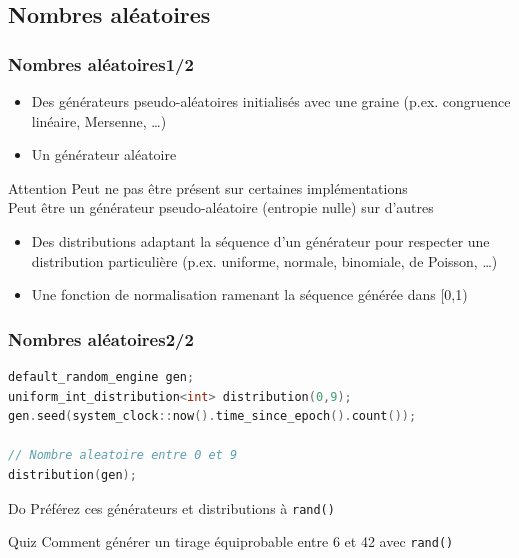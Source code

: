\documentclass[C++.tex]{subfiles}
\begin{document}
\subsection*{Nombres aléatoires}
\begin{frame}[fragile]
	\frametitle{Nombres aléatoires\titlehfill{}1/2}
	\begin{itemize}
		\item Des générateurs pseudo-aléatoires initialisés avec une graine (p.ex. congruence linéaire, Mersenne, \ldots)
		\item Un générateur aléatoire
	\end{itemize}

	\begin{alertblock}{Attention}
		Peut ne pas être présent sur certaines implémentations\\
		Peut être un générateur pseudo-aléatoire (entropie nulle) sur d'autres
	\end{alertblock}

	\begin{itemize}
		\item Des distributions adaptant la séquence d'un générateur pour respecter une distribution particulière (p.ex. uniforme, normale, binomiale, de Poisson, \ldots)
		\item Une fonction de normalisation ramenant la séquence générée dans [0,1)
	\end{itemize}
\end{frame}

\begin{frame}[fragile]
	\frametitle{Nombres aléatoires\titlehfill{}2/2}
	\begin{lstlisting}[language=C++]
default_random_engine gen;
uniform_int_distribution<int> distribution(0,9);
gen.seed(system_clock::now().time_since_epoch().count());

// Nombre aleatoire entre 0 et 9
distribution(gen);\end{lstlisting}

	\begin{exampleblock}{Do}
		Préférez ces générateurs et distributions à \lstinline|rand()|
	\end{exampleblock}

	\begin{block}{Quiz}
		Comment générer un tirage équiprobable entre 6 et 42 avec \lstinline|rand()|
	\end{block}
\end{frame}
\end{document}

